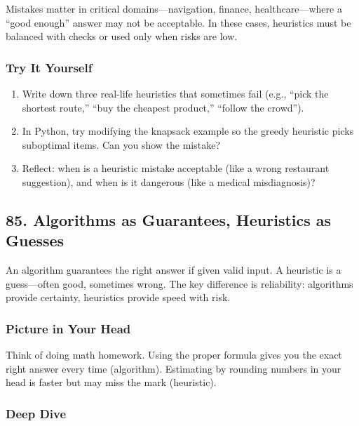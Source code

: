\documentclass[
  letterpaper,
  DIV=11,
  numbers=noendperiod]{scrreprt}
\providecommand{\tightlist}{%
  \setlength{\itemsep}{0pt}\setlength{\parskip}{0pt}}
\begin{document}
Mistakes matter in critical domains---navigation, finance,
healthcare---where a ``good enough'' answer may not be acceptable. In
these cases, heuristics must be balanced with checks or used only when
risks are low.

\subsubsection{Try It Yourself}\label{try-it-yourself-84}

\begin{enumerate}
\def\labelenumi{\arabic{enumi}.}
\tightlist
\item
  Write down three real-life heuristics that sometimes fail (e.g.,
  ``pick the shortest route,'' ``buy the cheapest product,'' ``follow
  the crowd'').
\item
  In Python, try modifying the knapsack example so the greedy heuristic
  picks suboptimal items. Can you show the mistake?
\item
  Reflect: when is a heuristic mistake acceptable (like a wrong
  restaurant suggestion), and when is it dangerous (like a medical
  misdiagnosis)?
\end{enumerate}

\subsection{85. Algorithms as Guarantees, Heuristics as
Guesses}\label{algorithms-as-guarantees-heuristics-as-guesses}

An algorithm guarantees the right answer if given valid input. A
heuristic is a guess---often good, sometimes wrong. The key difference
is reliability: algorithms provide certainty, heuristics provide speed
with risk.

\subsubsection{Picture in Your Head}\label{picture-in-your-head-85}

Think of doing math homework. Using the proper formula gives you the
exact right answer every time (algorithm). Estimating by rounding
numbers in your head is faster but may miss the mark (heuristic).

\subsubsection{Deep Dive}\label{deep-dive-55}
\end{document}
